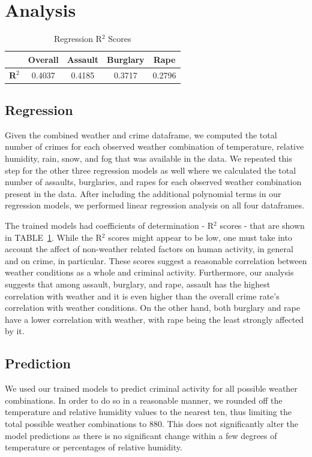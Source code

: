 \documentclass[conference]{IEEEtran}
\begin{document}
\section{Analysis}

\begin{table}[htbp]
\caption{Regression R$^{2}$ Scores}
\begin{center}
\begin{tabular}{|c|c|c|c|c|}
\hline
& \textbf{Overall} & \textbf{Assault} & \textbf{Burglary} & \textbf{Rape} \\
\hline
\textbf{R$^{2}$} & 0.4037 & 0.4185 & 0.3717 & 0.2796 \\
\hline
\end{tabular}
\label{r2}
\end{center}
\end{table}

\subsection{Regression}
Given the combined weather and crime dataframe, we computed the total number of crimes for each observed weather combination of temperature, relative humidity, rain, snow, and fog that was available in the data.
We repeated this step for the other three regression models as well where we calculated the total number of assaults, burglaries, and rapes for each observed weather combination present in the data.
After including the additional polynomial terms in our regression models, we performed linear regression analysis on all four dataframes.

The trained models had coefficients of determination - R$^{2}$ scores - that are shown in TABLE~\ref{r2}. 
While the R$^{2}$ scores might appear to be low, one must take into account the affect of non-weather related factors on human activity, in general and on crime, in particular.
These scores suggest a reasonable correlation between weather conditions as a whole and criminal activity.
Furthermore, our analysis suggests that among assault, burglary, and rape, assault has the highest correlation with weather and it is even higher than the overall crime rate's correlation with weather conditions.
On the other hand, both burglary and rape have a lower correlation with weather, with rape being the least strongly affected by it.

\subsection{Prediction}
We used our trained models to predict criminal activity for all possible weather combinations.
In order to do so in a reasonable manner, we rounded off the temperature and relative humidity values to the nearest ten, thus limiting the total possible weather combinations to 880.
This does not significantly alter the model predictions as there is no significant change within a few degrees of temperature or percentages of relative humidity.
\end{document}
